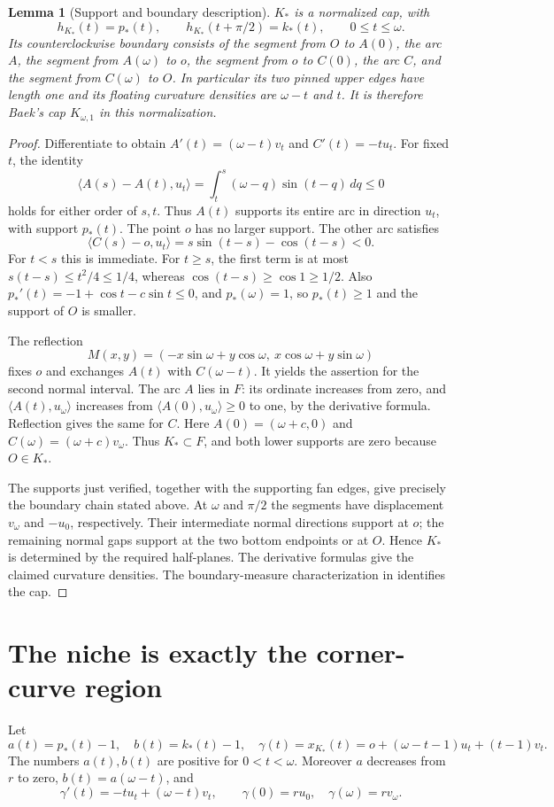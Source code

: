 \documentclass[11pt]{article}
\newtheorem{lemma}[theorem]{Lemma}
\theoremstyle{remark}\newtheorem{remark}[theorem]{Remark}
\newcommand{\ip}[2]{\langle #1,#2\rangle}
\begin{document}
\begin{lemma}[Support and boundary description]\label{lem:cap}
$K_*$ is a normalized cap, with
\[
 h_{K_*}(t)=p_*(t),\qquad h_{K_*}(t+\pi/2)=k_*(t),\qquad0\le t\le\omega.
\]
Its counterclockwise boundary consists of the segment from $O$ to $A(0)$, the arc $A$, the segment from $A(\omega)$ to $o$, the segment from $o$ to $C(0)$, the arc $C$, and the segment from $C(\omega)$ to $O$. In particular its two pinned upper edges have length one and its floating curvature densities are $\omega-t$ and $t$. It is therefore Baek's cap $K_{\omega,1}$ in this normalization.
\end{lemma}
\begin{proof}
Differentiate to obtain $A'(t)=(\omega-t)v_t$ and $C'(t)=-t u_t$. For fixed $t$, the identity
\[
 \ip{A(s)-A(t)}{u_t}=\int_t^s(\omega-q)\sin(t-q)\,dq\le0
\]
holds for either order of $s,t$. Thus $A(t)$ supports its entire arc in direction $u_t$, with support $p_*(t)$. The point $o$ has no larger support. The other arc satisfies
\[
 \ip{C(s)-o}{u_t}=s\sin(t-s)-\cos(t-s)<0.
\]
For $t<s$ this is immediate. For $t\ge s$, the first term is at most $s(t-s)\le t^2/4\le1/4$, whereas $\cos(t-s)\ge\cos1\ge1/2$. Also $p_*'(t)=-1+\cos t-c\sin t\le0$, and $p_*(\omega)=1$, so $p_*(t)\ge1$ and the support of $O$ is smaller.

The reflection
\[
 M(x,y)=(-x\sin\omega+y\cos\omega,\ x\cos\omega+y\sin\omega)
\]
fixes $o$ and exchanges $A(t)$ with $C(\omega-t)$. It yields the assertion for the second normal interval. The arc $A$ lies in $F$: its ordinate increases from zero, and $\ip{A(t)}{u_\omega}$ increases from $\ip{A(0)}{u_\omega}\ge0$ to one, by the derivative formula. Reflection gives the same for $C$. Here $A(0)=(\omega+c,0)$ and $C(\omega)=(\omega+c)v_\omega$. Thus $K_*\subset F$, and both lower supports are zero because $O\in K_*$.

The supports just verified, together with the supporting fan edges, give precisely the boundary chain stated above. At $\omega$ and $\pi/2$ the segments have displacement $v_\omega$ and $-u_0$, respectively. Their intermediate normal directions support at $o$; the remaining normal gaps support at the two bottom endpoints or at $O$. Hence $K_*$ is determined by the required half-planes. The derivative formulas give the claimed curvature densities. The boundary-measure characterization in \cite[Definition 5.12]{BaekConditional} identifies the cap.
\end{proof}

\section{The niche is exactly the corner-curve region}
Let
\[
 a(t)=p_*(t)-1,\quad b(t)=k_*(t)-1,\quad
 \gamma(t)=x_{K_*}(t)=o+(\omega-t-1)u_t+(t-1)v_t.
\]
The numbers $a(t),b(t)$ are positive for $0<t<\omega$. Moreover $a$ decreases from $r$ to zero, $b(t)=a(\omega-t)$, and
\begin{equation}\label{eq:gamma-prime}
 \gamma'(t)=-t u_t+(\omega-t)v_t,\qquad
 \gamma(0)=r u_0,\quad\gamma(\omega)=r v_\omega.
\end{equation}
\end{document}
